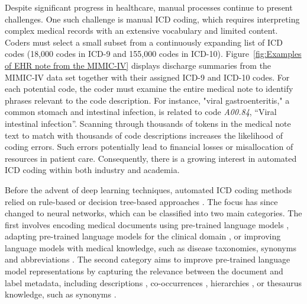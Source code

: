 \documentclass[11pt]{article}
\begin{document}
Despite significant progress in healthcare, manual processes continue to present challenges. One such challenge is manual ICD coding, which requires interpreting complex medical records with an extensive vocabulary and limited content. Coders must select a small subset from a continuously expanding list of ICD codes (18,000 codes in ICD-9 and 155,000 codes in ICD-10). Figure~\ref{fig:Examples of EHR note from the MIMIC-IV} displays discharge summaries from the MIMIC-IV data set together with their assigned ICD-9 and ICD-10 codes. 
For each potential code, the coder must examine the entire medical note to identify phrases relevant to the code description. For instance, "viral gastroenteritis," a common stomach and intestinal infection, is related to code \emph{A00.84}, ``Viral intestinal infection''. Scanning through thousands of tokens in the medical note text to match with thousands of code descriptions increases the likelihood of coding errors. Such errors potentially lead to financial losses or misallocation of resources in patient care. Consequently, there is a growing interest in automated ICD coding within both industry and academia.

\begin{figure*}[t!]
\centering
{}\caption{\small Two example EHR notes from the MIMIC-IV dataset, featuring both ICD-9 and ICD-10 codes (top) alongside their corresponding discharge note text (bottom). For clarity, each code and its related mentions or evidence within the note text are color-coded. }
\label{fig:Examples of EHR note from the MIMIC-IV}
\end{figure*}

Before the advent of deep learning techniques, automated ICD coding methods relied on rule-based or decision tree-based approaches \citep{rulebaseicd2008,scheurwegs2017selecting}. The focus has since changed to neural networks, which can be classified into two main categories. The first involves encoding medical documents using pre-trained language models \citep{li2020multirescnn, liu-etal-2021-effective}, adapting pre-trained language models for the clinical domain \citep{lewis-etal-2020-pretrained}, or improving language models with medical knowledge, such as disease taxonomies, synonyms and abbreviations \citep{Yang2022KnowledgeIP,yuan-etal-2022-code}. The second category aims to improve pre-trained language model representations by capturing the relevance between the document and label metadata, including descriptions \citep{mullenbach-etal-2018-explainable,ijcai2020-461-vu}, co-occurrences \citep{cao-etal-2020-hypercore}, hierarchies \citep{falis-etal-2019-ontological,ijcai2020-461-vu}, or thesaurus knowledge, such as synonyms \citep{yuan-etal-2022-code}.
\end{document}
